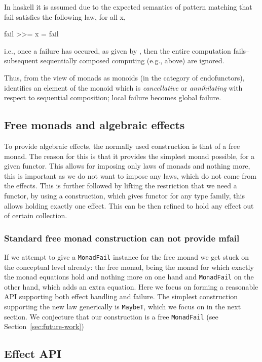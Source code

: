 \documentclass[10pt]{article}
\theoremstyle{definition}
\theoremstyle{remark}
\begin{document}
In haskell it is assumed due to the expected semantics of pattern matching that fail satisfies the following law, for all x,
%
\begin{haskell}
	fail >>= x = fail
\end{haskell}
%
i.e., once a failure has occured, as given by , then the
entire computation fails--subsequent sequentially composed computing
(e.g.,  above) are ignored.

Thus, from the view of monads as monoids (in the category of
endofunctors),  identifies an element of the monoid
which is \emph{cancellative} or \emph{annihilating} with respect
to sequential composition; local failure becomes
global failure.

\subsection{Free monads and algebraic effects}
To provide algebraic effects, the normally used construction is that of a free monad.
The reason for this is that it provides the simplest monad possible, for a given functor.
This allows for imposing only laws of monads and nothing more, this is important as we do not want to impose any laws, which do not come from the effects. This is further followed by lifting the restriction that we need a functor, by using a construction, which gives functor for any type family, this allows holding exactly one effect. This can be then refined to hold any effect out of certain collection.

\subsubsection{Standard free monad construction can not provide mfail}

If we attempt to give a \texttt{MonadFail} instance for the free monad we get
stuck on the conceptual level already: the free monad, being the monad for
which exactly the monad equations hold and nothing more on one hand
and \texttt{MonadFail} on the other hand, which adds an extra equation.
Here we focus on forming a reasonable API supporting both effect handling and failure.
The simplest construction supporting the new law generically is
\texttt{MaybeT}, which we focus on in the next section. We conjecture
that our construction is a free \texttt{MonadFail} (see
Section~\ref{sec:future-work})

\subsection{Effect API}
\end{document}
